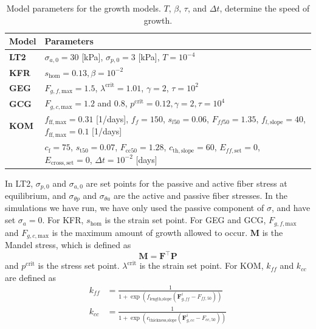\begin{table}[htbp]
    \centering
    \begin{tabular}{|l|l|}
    \hline
    \textbf{Model} & \textbf{Parameters} \\
    \hline
    \textbf{LT2} &   $\sigma_{a,0} = 30$ [kPa], $\sigma_{p,0} = 3$ [kPa], $T = 10^{-4}$ \\ \hline
    \textbf{KFR} &  $s_\mathrm{hom} = 0.13, \beta = 10^{-2}$ \\ \hline
    \textbf{GEG} &  $F_{g,f,\mathrm{max}}=1.5$, $\lambda^\mathrm{crit}=1.01$, $\gamma = 2$, $\tau = 10^2$ \\ \hline
    \textbf{GCG} &  $F_{g,c,\mathrm{max}}=1.2$ and $0.8$,  $p^\mathrm{crit}=0.12, \gamma = 2, \tau = 10^4$ \\ \hline
    \textbf{KOM} &  $f_\mathrm{ff,max} =0.31$ [1/days], $f_f = 150$, $s_{l50} = 0.06$, $F_{ff50} = 1.35$, $f_{l,\mathrm{slope}} = 40$, $f_\mathrm{ff,max} = 0.1$ [1/days] \\
        & $c_\mathrm{f} = 75$, $s_\mathrm{t50} = 0.07$, $F_\mathrm{cc50} = 1.28$, $c_\mathrm{th,slope} = 60$, $E_{ff,\mathrm{set}} = 0$, 
        $E_\mathrm{cross,\mathrm{set}} = 0$, $\Delta t = 10^{-2}$ [days] \\ \hline
    \end{tabular}
    \caption{Model parameters for the growth models. $T$, $\beta$, $\tau$, and $\Delta t$, determine the speed of growth.}
    \label{tab:parameters}
\end{table}
In LT2, $\sigma_{p,0}$ and $\sigma_{a,0}$ are set points for the passive and active fiber stress at equilibrium, and $\sigma_{\theta p}$ and $\sigma_{\theta a}$ are the active and passive fiber stresses. In the simulations we have run, we have only used the passive component of $\sigma$, and have set $\sigma_a = 0$. For KFR, $s_\mathrm{hom}$ is the strain set point. For GEG and GCG, $F_{g,f,\mathrm{max}}$ and $F_{g,c,\mathrm{max}}$ is the maximum amount of growth allowed to occur. $\mathbf{M}$ is the Mandel stress, which is defined as 
\begin{equation*}
    \mathbf{M} = \mathbf{F}^\top \mathbf{P}
\end{equation*}
and $p^\mathrm{crit}$ is the stress set point. $\lambda^\text{crit}$ is the strain set point. For KOM, $k_{ff}$ and $k_{cc}$ are defined as
\begin{align*}
    k_{ff} &= \frac{1}{1 + \exp(f_\text{length,slope}(\mathbf{F}_{g,ff}^i - F_{ff,50}))} \\
    k_{cc} &= \frac{1}{1 + \exp(c_\text{thickness,slope}(\mathbf{F}_{g,cc}^i - F_{cc,50}))}
\end{align*}
